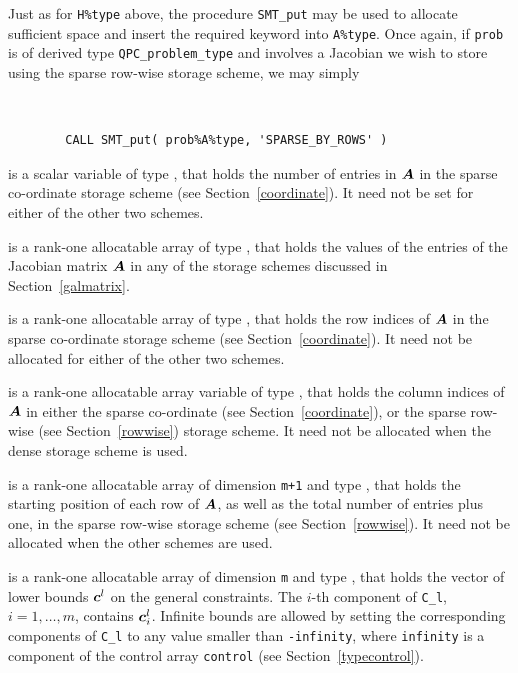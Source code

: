 \documentclass{galahad}
\newcommand{\packagename}{QPC}
\begin{document}
\begin{description}
\begin{description}
Just as for {\tt H\%type} above, the procedure {\tt SMT\_put} 
may be used to allocate sufficient space and insert the required keyword
into {\tt A\%type}.
Once again, if {\tt prob} is of derived type {\tt \packagename\_problem\_type}
and involves a Jacobian we wish to store using the sparse row-wise 
storage scheme, we may simply
{\tt 
\begin{verbatim}
        CALL SMT_put( prob%A%type, 'SPARSE_BY_ROWS' )
\end{verbatim}
}
\noindent

 is a scalar variable of type \integer, that 
holds the number of entries in ${\bm{A}}$
in the sparse co-ordinate storage scheme (see Section~\ref{coordinate}). 
It need not be set for either of the other two schemes.

 is a rank-one allocatable array of type \realdp, that holds
the values of the entries of the Jacobian matrix ${\bm{A}}$ in any of the 
storage schemes discussed in Section~\ref{galmatrix}.

 is a rank-one allocatable array of type \integer,
that holds the row indices of ${\bm{A}}$ in the sparse co-ordinate storage
scheme (see Section~\ref{coordinate}). 
It need not be allocated for either of the other two schemes.

 is a rank-one allocatable array variable of type \integer,
that holds the column indices of ${\bm{A}}$ in either the sparse co-ordinate 
(see Section~\ref{coordinate}), or the sparse row-wise 
(see Section~\ref{rowwise}) storage scheme.
It need not be allocated when the dense storage scheme is used.

 is a rank-one allocatable array of dimension {\tt m+1} and type 
\integer, that holds the 
starting position of each row of ${\bm{A}}$, as well
as the total number of entries plus one, in the sparse row-wise storage
scheme (see Section~\ref{rowwise}). It need not be allocated when the
other schemes are used.

\end{description}

 is a rank-one allocatable array of dimension {\tt m} and type 
\realdp, that holds the vector of lower bounds ${\bm{c}}^{l}$ 
on the general constraints. The $i$-th component of 
{\tt C\_l}, $i = 1, \ldots , m$, contains ${\bm{c}}_{i}^{l}$.
Infinite bounds are allowed by setting the corresponding 
components of {\tt C\_l} to any value smaller than {\tt -infinity}, 
where {\tt infinity} is a component of the control array {\tt control} 
(see Section~\ref{typecontrol}).


\end{description}
\end{document}
